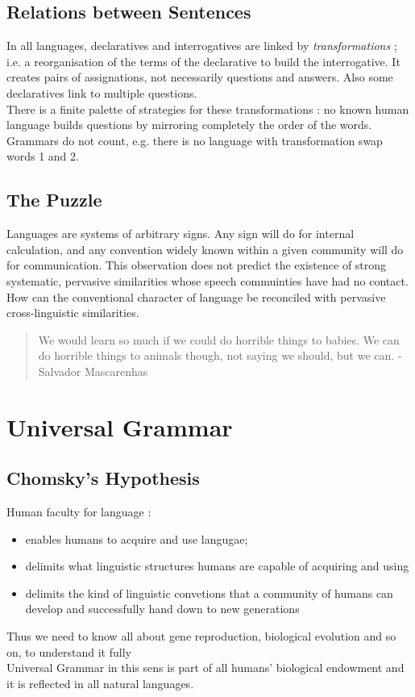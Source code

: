\documentclass{cours}
\begin{document}
\subsection{Relations between Sentences}
In all languages, declaratives and interrogatives are linked by \emph{transformations} ; i.e. a reorganisation of the terms of the declarative to build the interrogative. It creates pairs of assignations, not necessarily questions and answers. Also some declaratives link to multiple questions. \\
There is a finite palette of strategies for these transformations : no known human language builds questions by mirroring completely the order of the words. Grammars do not count, e.g. there is no language with transformation swap words 1 and 2.\\

\subsection{The Puzzle}
Languages are systems of arbitrary signs. Any sign will do for internal calculation, and any convention widely known within a given community will do for communication. This observation does not predict the existence of strong systematic, pervasive similarities whose speech commuinties have had no contact. \\
How can the conventional character of language be reconciled with pervasive cross-linguistic similarities. 
\begin{quote}
    \og We would learn so much if we could do horrible things to babies. We can do horrible things to animals though, not saying we should, but we can.  \fg - Salvador Mascarenhas
\end{quote}

\section{Universal Grammar}
\subsection{Chomsky's Hypothesis}
Human faculty for language : \begin{itemize}
    \item enables humans to acquire and use langugae;
    \item delimits what linguistic structures humans are capable of acquiring and using
    \item delimits the kind of linguistic convetions that a community of humans can develop and successfully hand down to new generations
\end{itemize}
Thus we need to know all about gene reproduction, biological evolution and so on, to understand it fully \\
Universal Grammar in this sens is part of all humans' biological endowment and it is reflected in all natural languages.
\end{document}
